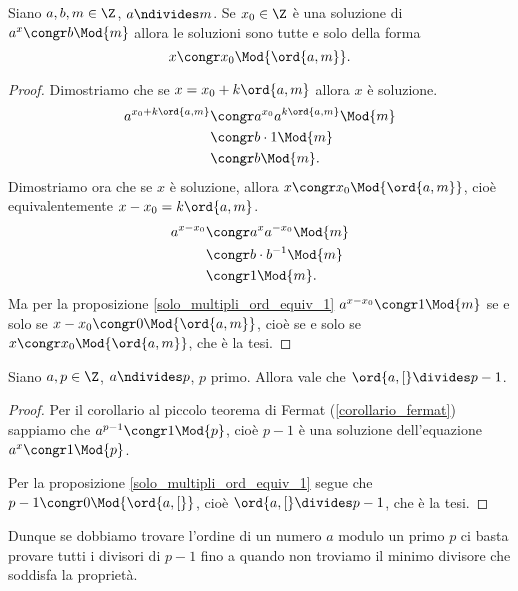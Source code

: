 \begin{proposition}
    Siano $a, b, m \in \Z$, $a \ndivides m$. Se $x_0 \in \Z$ è una soluzione di $a^x \congr b \Mod{m}$ allora le soluzioni sono tutte e solo della forma \begin{equation}
        x \congr x_0 \Mod{\ord{a, m}}.
    \end{equation}
\end{proposition}
\begin{proof}
    Dimostriamo che se $x = x_0 + k\ord{a, m}$ allora $x$ è soluzione.
    \begin{alignat*}
        {1}
        a^{x_0 + k\ord{a, m}} &\congr a^{x_0}a^{k\ord{a, m}} \Mod{m} \\
        &\congr b \cdot 1 \Mod{m} \\
        &\congr b \Mod{m}.
    \end{alignat*}
    Dimostriamo ora che se $x$ è soluzione, allora $x \congr x_0 \Mod{\ord{a, m}}$, cioè equivalentemente $x - x_0 = k\ord{a, m}$.
    \begin{alignat*}
        {1}
        a^{x - x_0} &\congr a^{x}a^{-x_0} \Mod{m} \\
        &\congr b \cdot b^{-1} \Mod{m} \\
        &\congr 1 \Mod{m}.
    \end{alignat*}
    Ma per la proposizione \ref{solo_multipli_ord_equiv_1} $a^{x - x_0} \congr 1 \Mod{m}$ se e solo se $x - x_0 \congr 0 \Mod{\ord{a, m}}$, cioè se e solo se $x \congr x_0 \Mod{\ord{a, m}}$, che è la tesi.
\end{proof}

\begin{proposition}
    Siano $a, p \in \Z$, $a \ndivides p$, $p$ primo. Allora vale che $\ord{a, [} \divides p-1$.
\end{proposition}
\begin{proof}
    Per il corollario al piccolo teorema di Fermat (\ref{corollario_fermat}) sappiamo che $a^{p-1} \congr 1 \Mod{p}$, cioè $p-1$ è una soluzione dell'equazione $a^x \congr 1 \Mod{p}$. 
    
    Per la proposizione \ref{solo_multipli_ord_equiv_1} segue che $p-1 \congr 0 \Mod{\ord{a, [}}$, cioè $\ord{a, [} \divides p-1$, che è la tesi.
\end{proof}

Dunque se dobbiamo trovare l'ordine di un numero $a$ modulo un primo $p$ ci basta provare tutti i divisori di $p - 1$ fino a quando non troviamo il minimo divisore che soddisfa la proprietà.

